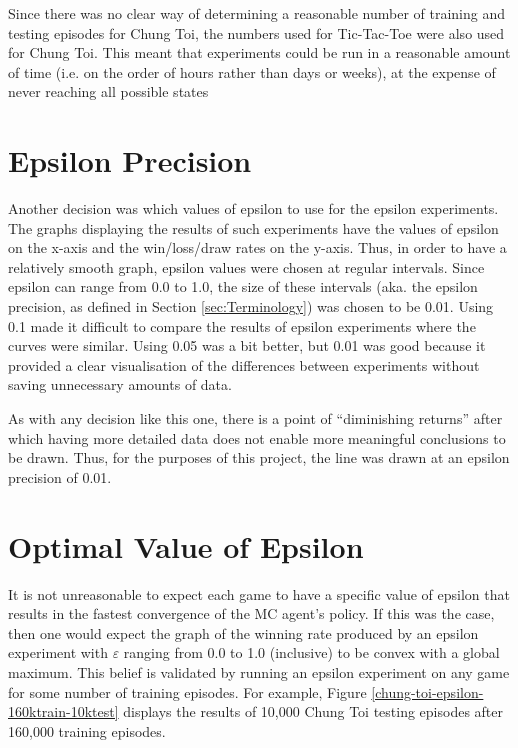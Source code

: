 \documentclass[11pt,a4paper]{report}
\begin{document}
Since there was no clear way of determining a reasonable number of training and testing episodes for Chung Toi, the numbers used for Tic-Tac-Toe were also used for Chung Toi. This meant that experiments could be run in a reasonable amount of time (i.e. on the order of hours rather than days or weeks), at the expense of never reaching all possible states


\section{Epsilon Precision}
\label{sec:epsilon-precision}

Another decision was which values of epsilon to use for the epsilon experiments. The graphs displaying the results of such experiments have the values of epsilon on the x-axis and the win/loss/draw rates on the y-axis. Thus, in order to have a relatively smooth graph, epsilon values were chosen at regular intervals. Since epsilon can range from 0.0 to 1.0, the size of these intervals (aka. the epsilon precision, as defined in Section \ref{sec:Terminology}) was chosen to be 0.01. Using 0.1 made it difficult to compare the results of epsilon experiments where the curves were similar. Using 0.05 was a bit better, but 0.01 was good because it provided a clear visualisation of the differences between experiments without saving unnecessary amounts of data.

As with any decision like this one, there is a point of ``diminishing returns'' after which having more detailed data does not enable more meaningful conclusions to be drawn. Thus, for the purposes of this project, the line was drawn at an epsilon precision of 0.01.


\section{Optimal Value of Epsilon}
\label{sec:optimal_epsilon}

It is not unreasonable to expect each game to have a specific value of epsilon that results in the fastest convergence of the MC agent's policy. If this was the case, then one would expect the graph of the winning rate produced by an epsilon experiment with $\varepsilon$ ranging from 0.0 to 1.0 (inclusive) to be convex with a global maximum. This belief is validated by running an epsilon experiment on any game for some number of training episodes. For example, Figure \ref{chung-toi-epsilon-160ktrain-10ktest} displays the results of 10,000 Chung Toi testing episodes after 160,000 training episodes.
\end{document}

